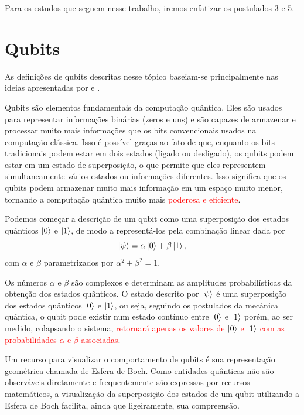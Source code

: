 Para os estudos que seguem nesse trabalho, iremos enfatizar os postulados 3 e 5.


\section{Qubits}

As definições de qubits descritas nesse tópico baseiam-se principalmente nas ideias apresentadas por \textcite{chuang} e \textcite{CompInfoQuantica}.

Qubits são elementos fundamentais da computação quântica. Eles são usados para representar informações binárias (zeros e uns) e são capazes de armazenar e processar muito mais informações que os bits convencionais usados na computação clássica. Isso é possível graças ao fato de que, enquanto os bits tradicionais podem estar em dois estados (ligado ou desligado), os qubits podem estar em um estado de superposição, o que permite que eles representem simultaneamente vários estados ou informações diferentes. Isso significa que os qubits podem armazenar muito mais informação em um espaço muito menor, tornando a computação quântica muito mais \textcolor{red}{poderosa e eficiente}.


Podemos começar a descrição de um qubit como uma superposição dos estados quânticos $\ket{0}$ e $\ket{1}$, de modo a representá-los pela combinação linear dada por
\begin{equation}\label{psi}
\ket{\psi} = \alpha \ket{0} + \beta \ket{1},
\end{equation}
com $\alpha$ e $\beta$ parametrizados por \(\alpha^{2} + \beta^{2} = 1\).

Os números $\alpha$ e $\beta$ são complexos e determinam as amplitudes probabilísticas da obtenção dos estados quânticos. O estado descrito por $\ket{\psi}$ é uma superposição dos estados quânticos $\ket{0}$ e $\ket{1}$, ou seja, seguindo os postulados da mecânica quântica, o qubit pode existir num estado contínuo entre $\ket{0}$ e $\ket{1}$ porém, ao ser medido, colapsando o sistema, \textcolor{red}{retornará apenas os valores de $\ket{0}$ e $\ket{1}$ com as probabilidades $\alpha$ e $\beta$ associadas}.


Um recurso para visualizar o comportamento de qubits é sua representação geométrica chamada de Esfera de Boch. Como entidades quânticas não são observáveis diretamente e frequentemente são expressas por recursos matemáticos, a visualização da superposição dos estados de um qubit utilizando a Esfera de Boch facilita, ainda que ligeiramente, sua compreensão.

